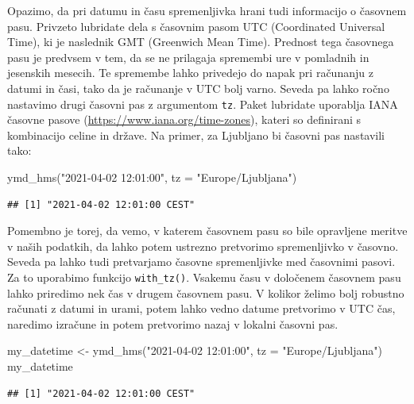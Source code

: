 \documentclass[
]{book}
\newenvironment{Shaded}{\begin{snugshade}}{\end{snugshade}}
\newcommand{\AttributeTok}[1]{\textcolor[rgb]{0.77,0.63,0.00}{#1}}
\newcommand{\FunctionTok}[1]{\textcolor[rgb]{0.00,0.00,0.00}{#1}}
\newcommand{\NormalTok}[1]{#1}
\newcommand{\OtherTok}[1]{\textcolor[rgb]{0.56,0.35,0.01}{#1}}
\newcommand{\StringTok}[1]{\textcolor[rgb]{0.31,0.60,0.02}{#1}}
\begin{document}
Opazimo, da pri datumu in času spremenljivka hrani tudi informacijo o časovnem pasu. Privzeto lubridate dela s časovnim pasom UTC (Coordinated Universal Time), ki je naslednik GMT (Greenwich Mean Time). Prednost tega časovnega pasu je predvsem v tem, da se ne prilagaja spremembi ure v pomladnih in jesenskih mesecih. Te spremembe lahko privedejo do napak pri računanju z datumi in časi, tako da je računanje v UTC bolj varno. Seveda pa lahko ročno nastavimo drugi časovni pas z argumentom \texttt{tz}. Paket lubridate uporablja IANA časovne pasove (\url{https://www.iana.org/time-zones}), kateri so definirani s kombinacijo celine in države. Na primer, za Ljubljano bi časovni pas nastavili tako:

\begin{Shaded}
\begin{Highlighting}[]
\FunctionTok{ymd\_hms}\NormalTok{(}\StringTok{"2021{-}04{-}02 12:01:00"}\NormalTok{, }\AttributeTok{tz =} \StringTok{"Europe/Ljubljana"}\NormalTok{)}
\end{Highlighting}
\end{Shaded}

\begin{verbatim}
## [1] "2021-04-02 12:01:00 CEST"
\end{verbatim}

Pomembno je torej, da vemo, v katerem časovnem pasu so bile opravljene meritve v naših podatkih, da lahko potem ustrezno pretvorimo spremenljivko v časovno. Seveda pa lahko tudi pretvarjamo časovne spremenljivke med časovnimi pasovi. Za to uporabimo funkcijo \texttt{with\_tz()}. Vsakemu času v določenem časovnem pasu lahko priredimo nek čas v drugem časovnem pasu. V kolikor želimo bolj robustno računati z datumi in urami, potem lahko vedno datume pretvorimo v UTC čas, naredimo izračune in potem pretvorimo nazaj v lokalni časovni pas.

\begin{Shaded}
\begin{Highlighting}[]
\NormalTok{my\_datetime }\OtherTok{\textless{}{-}} \FunctionTok{ymd\_hms}\NormalTok{(}\StringTok{"2021{-}04{-}02 12:01:00"}\NormalTok{, }\AttributeTok{tz =} \StringTok{"Europe/Ljubljana"}\NormalTok{)}
\NormalTok{my\_datetime}
\end{Highlighting}
\end{Shaded}

\begin{verbatim}
## [1] "2021-04-02 12:01:00 CEST"
\end{verbatim}
\end{document}
